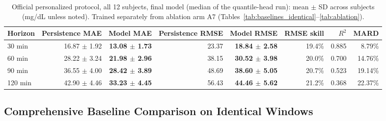 \documentclass[journal]{IEEEtran}
\begin{document}
\begin{table}[t]
\centering
\caption{Official personalized protocol, all 12 subjects, final model (median of the quantile-head run): mean $\pm$ SD across subjects (mg/dL unless noted). Trained separately from ablation arm A7 (Tables~\ref{tab:baselines_identical}--\ref{tab:ablation}).}
\label{tab:official}
\footnotesize
\begin{tabular}{lrrrrrrr}
\toprule
Horizon & Persistence MAE & Model MAE & Persistence RMSE & Model RMSE & RMSE skill & $R^2$ & MARD \\
\midrule
30 min & 16.87 $\pm$ 1.92 & \textbf{13.08 $\pm$ 1.73} & 23.37 & \textbf{18.84 $\pm$ 2.58} & 19.4\% & 0.885 & 8.79\% \\
60 min & 28.22 $\pm$ 3.24 & \textbf{21.98 $\pm$ 2.96} & 38.15 & \textbf{30.52 $\pm$ 3.98} & 20.0\% & 0.700 & 14.76\% \\
90 min & 36.55 $\pm$ 4.00 & \textbf{28.42 $\pm$ 3.89} & 48.69 & \textbf{38.60 $\pm$ 5.05} & 20.7\% & 0.523 & 19.14\% \\
120 min & 42.90 $\pm$ 4.46 & \textbf{33.23 $\pm$ 4.45} & 56.43 & \textbf{44.46 $\pm$ 5.62} & 21.2\% & 0.368 & 22.37\% \\
\bottomrule
\end{tabular}
\end{table}

\subsection{Comprehensive Baseline Comparison on Identical Windows}
\label{sec:baselines_identical}
\end{document}
